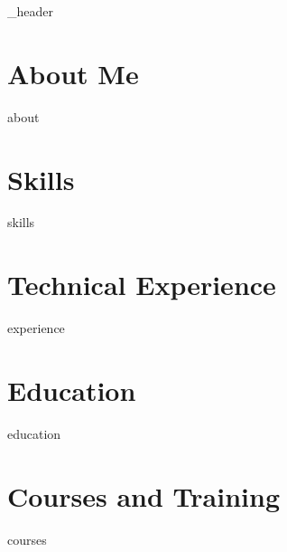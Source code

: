 \documentclass[a4,10pt]{article}
\author{Sławomir Cielepak} %
\begin{document}
{_header}

\section{About Me}
{about}

\section{Skills}
{skills}

\section{Technical Experience}
{experience}

\newpage

\section{Education}
{education}

\section{Courses and Training}
{courses}
\end{document}
